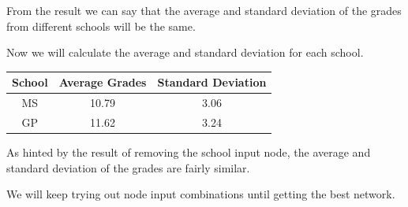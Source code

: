\documentclass[11pt]{article}
\begin{document}
From the result we can say that the average and standard deviation of the grades from different schools will be the same.

Now we will calculate the average and standard deviation for each school.

\begin{tabular}{| c | c | c |}
\hline \textbf{School} & \textbf{Average Grades} & \textbf{Standard Deviation}\\
\hline MS & 10.79 & 3.06\\
\hline GP & 11.62 & 3.24\\
\hline
\end{tabular}

As hinted by the result of removing the school input node, the average and standard deviation of the grades are fairly similar.

\newpage
We will keep trying out node input combinations until getting the best network.
\end{document}
